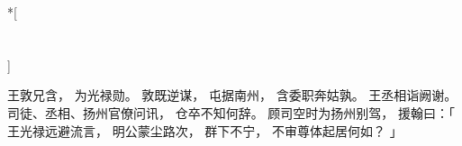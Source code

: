 
\switchcolumn[0]*[\section{}]

王敦兄含，
为光禄勋。
敦既逆谋，
屯据南州，
含委职奔姑孰。
王丞相诣阙谢。
司徒、丞相、扬州官僚问讯，
仓卒不知何辞。
顾司空时为扬州别驾，
援翰曰：「
    王光禄远避流言，
    明公蒙尘路次，
    群下不宁，
    不审尊体起居何如？
」

\switchcolumn


